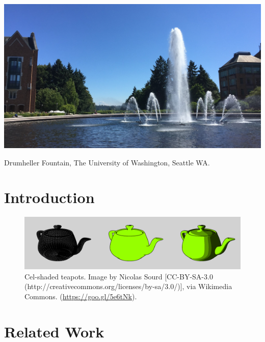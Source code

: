 \documentclass[acmtog]{acmart}
\begin{document}


\begin{teaserfigure}
  \centering
  \includegraphics[width=6.0in]{fountain}
  \caption{Drumheller Fountain, The University of Washington, Seattle WA.}
\end{teaserfigure}

\maketitle

\section{Introduction}


\begin{figure}[ht]
  \centering
  \includegraphics[width=\linewidth]{teapots}
  \caption{Cel-shaded teapots. Image by Nicolas Sourd [CC-BY-SA-3.0 (http://creativecommons.org/licenses/by-sa/3.0/)], via Wikimedia Commons. (\url{https://goo.gl/5e6tNk}).}
\end{figure}


\section{Related Work}
\end{document}
